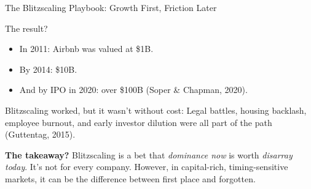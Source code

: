 \begin{HistoricalSidebar}{The Blitzscaling Playbook: Growth First, Friction Later}
    \medskip
    
    The result?
  
    \medskip
    
    \begin{itemize}
      \item In 2011: Airbnb was valued at \$1B.
      \item By 2014: \$10B.
      \item And by IPO in 2020: over \$100B (Soper \& Chapman, 2020).
    \end{itemize}
    
    \medskip
    
    Blitzscaling worked, but it wasn't without cost:  
    Legal battles, housing backlash, employee burnout, and early investor dilution were all part of the path (Guttentag, 2015).
    
    \medskip
    
    \textbf{The takeaway?}  
    Blitzscaling is a bet that \textit{dominance now} is worth \textit{disarray today}.  
    It’s not for every company. However, in capital-rich, timing-sensitive markets, it can be the difference between first place 
    and forgotten.
    
  \end{HistoricalSidebar}
  
